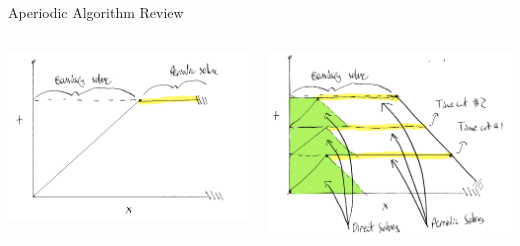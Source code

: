 \begin{frame}{Aperiodic Algorithm Review}
  \begin{columns}
  \centering
\begin{center}
  \includegraphics[width=\textwidth]{ap_review_1.png}
  \end{center}

  \centering

  \begin{center}
  \includegraphics[width=\textwidth]{ap_review_2.png}
  \end{center}
\end{columns}
\end{frame}



